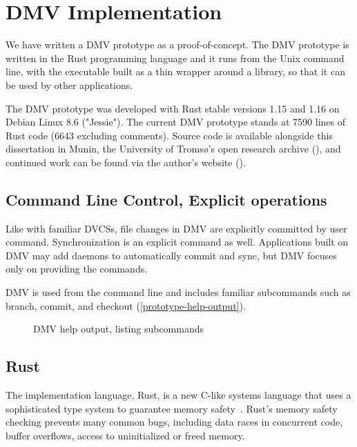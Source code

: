 \chapter{DMV Implementation}

We have written a \gls{DMV} prototype as a proof-of-concept. The \gls{DMV}
prototype is written in the Rust programming language and it runs from the Unix
command line, with the executable built as a thin wrapper around a library, so
that it can be used by other applications.

The \gls{DMV} prototype was developed with Rust stable versions 1.15 and 1.16 on
Debian Linux 8.6 ("Jessie"). The current DMV prototype stands at \num{7590}
lines of Rust code (\num{6643} excluding comments). Source code is available
alongside this dissertation in Munin, the University of Tromsø's open research
archive (\muninurl), and continued work can be found via the author's website
(\dmvurl).

%


\section{Command Line Control, Explicit operations}

Like with familiar \glspl{DVCS}, file changes in \gls{DMV} are explicitly
committed by user command. Synchronization is an explicit command as well.
Applications built on \gls{DMV} may add daemons to automatically \gls{commit}
and sync, but \gls{DMV} focuses only on providing the commands.

\gls{DMV} is used from the command line and includes familiar subcommands such
as branch, \gls{commit}, and checkout
(\autoref{prototype-help-output}).

\begin{figure}[]
    \caption{DMV help output, listing subcommands}
    \label{prototype-help-output}


\end{figure}

%


\section{Rust}

The implementation language, Rust, is a new C-like systems language that uses a
sophisticated type system to guarantee memory safety~\cite{rust_acm_sigada}.
Rust's memory safety checking prevents many common bugs, including data races in
concurrent code, buffer overflows, access to uninitialized or freed memory.

